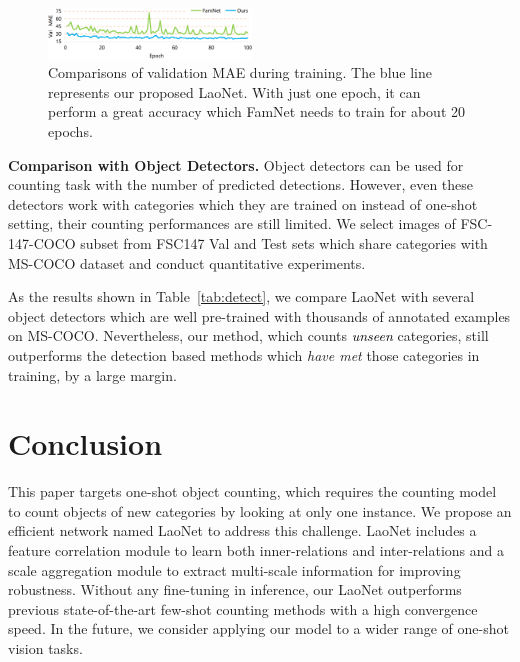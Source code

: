 \documentclass{article}
\newcommand\XP[1]{\textcolor{black}{#1}}%
\begin{document}
\begin{figure}[t]
  \centering
  \includegraphics[width = 0.48\textwidth]{converge.png}
   \caption{Comparisons of validation MAE during training. The blue line represents our proposed LaoNet. With just one epoch, it can perform a great accuracy which FamNet needs to train for about 20 epochs.}
   \label{fig:converge}
\end{figure}


\noindent \textbf{Comparison with Object Detectors.}
Object detectors can be used for counting task with the number of predicted detections. However, even these detectors work with categories which they are trained on instead of one-shot setting, their counting performances are still limited. We select images of FSC-147-COCO subset from FSC147 Val and Test sets which share categories with MS-COCO dataset and conduct quantitative experiments.

As the results shown in Table~\ref{tab:detect}, we compare LaoNet with several object detectors which are well pre-trained with thousands of annotated examples on MS-COCO. Nevertheless, our method, which counts \XP{\emph{unseen}} categories, still outperforms the detection based methods which \emph{have met} those categories in training, by a large margin.




\section{Conclusion}

This paper targets one-shot object counting, which requires the counting model to count objects of new categories by looking at only one instance. We propose an efficient network named LaoNet to address this challenge. LaoNet includes a feature correlation module to learn both inner-relations and inter-relations and a scale aggregation module to extract multi-scale information for improving robustness. Without any fine-tuning in inference, our LaoNet outperforms previous state-of-the-art few-shot counting methods with a high convergence speed. In the future, we consider applying our model to a wider range of one-shot vision tasks.







\end{document}
